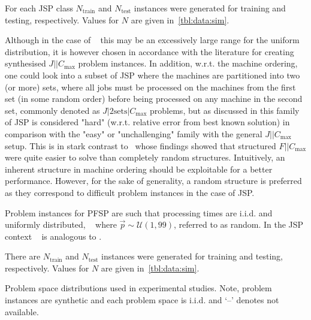 \documentclass[smallextended]{svjour3}
\begin{document}
For each JSP class $N_{\text{train}}$  and $N_{\text{test}}$ instances were generated for training and testing, respectively. Values for $N$ are given in~\cref{tbl:data:sim}. 

Although in the case of \jrnd~ this may be an excessively large range for the uniform distribution, it is however chosen in accordance with the literature \citep{Demirkol98} for creating synthesised $J||C_{\max}$ problem instances. In addition, w.r.t. the machine ordering, one could look into a subset of JSP where the machines are partitioned into two (or more) sets, where all jobs must be processed on the machines from the first set (in some random order) before being processed on any machine in the second set, commonly denoted as $J|2\textrm{sets}|C_{\max}$ problems, but as discussed in \cite{orlib_swv} this family of JSP is considered "hard" (w.r.t. relative error from best known solution) in comparison with the "easy" or "unchallenging" family with the general $J||C_{\max}$ setup. %
This is in stark contrast to~\citet{Whitley} whose findings showed that structured $F||C_{\max}$ were quite easier to solve than completely random structures. 
Intuitively, an inherent structure in machine ordering should be exploitable for a better performance.  However, for the sake of generality, a random structure is preferred as they correspond to difficult problem instances in the case of JSP. 

Problem instances for PFSP are such that processing times are i.i.d. and uniformly distributed, 
\frnd~ where $\vec{p}\sim\mathcal{U}(1,99)$, referred to as random. In the JSP context \frnd~ is analogous to \jrnd.

There are $N_{\text{train}}$  and $N_{\text{test}}$ instances were generated for training and testing, respectively. Values for $N$ are given in~\cref{tbl:data:sim}. 

\begin{table}\centering
\caption[Problem space distributions used in experimental studies.]{Problem space distributions used in experimental studies. Note, problem instances are synthetic and each problem space is i.i.d. and `--' denotes not available.}\label{tbl:data:sim}

\end{table}
\end{document}
